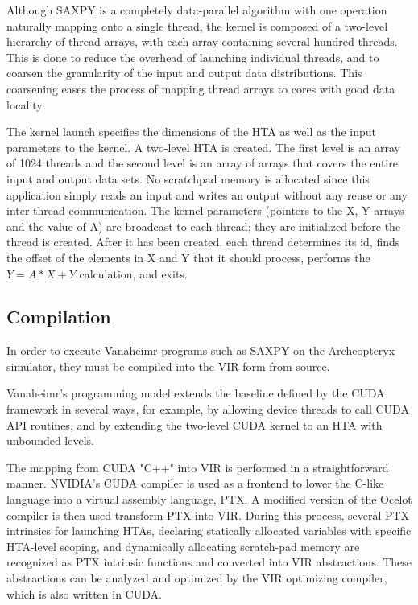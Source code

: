 \documentclass[conference, 10pt]{IEEEtran}
\begin{document}
Although SAXPY is a completely data-parallel algorithm with one operation
naturally mapping onto a single thread, the kernel is composed of a two-level
hierarchy of thread arrays, with each array containing several hundred threads.
This is done to reduce the overhead of launching individual threads, and to
coarsen the granularity of the input and output data distributions.  This
coarsening eases the process of mapping thread arrays to cores with good data
locality.

The kernel launch specifies the dimensions of the HTA as well as the input
parameters to the kernel.  A two-level HTA is created.  The first level is an
array of 1024 threads and the second level is an array of arrays that covers
the entire input and output data sets.  No scratchpad memory is allocated since
this application simply reads an input and writes an output without any reuse
or any inter-thread communication.  The kernel parameters (pointers to the X, Y
arrays and the value of A) are broadcast to each thread; they are initialized
before the thread is created.  After it has been created, each thread determines
its id, finds the offset of the elements in X and Y that it should process,
performs the $Y = A*X+Y$ calculation, and exits.

\subsection{Compilation}

In order to execute Vanaheimr programs such as SAXPY on the Archeopteryx
simulator, they must be compiled into the VIR form from source.  

Vanaheimr's programming model extends the baseline defined by the CUDA framework in
several ways, for example, by allowing device threads to call CUDA API routines,
and by extending the two-level CUDA kernel to an HTA with unbounded levels.



The mapping from CUDA "C++" into VIR is performed in a straightforward manner.
NVIDIA's CUDA compiler is used as a frontend to lower the C-like language into
a virtual assembly language, PTX.  A modified version of the Ocelot compiler is
then used transform PTX into VIR.  During this process, several PTX intrinsics
for launching HTAs, declaring statically allocated variables with specific
HTA-level scoping, and dynamically allocating scratch-pad memory are recognized
as PTX intrinsic functions and converted into VIR abstractions.  These
abstractions can be analyzed and optimized by the VIR optimizing compiler, which
is also written in CUDA.
\end{document}
